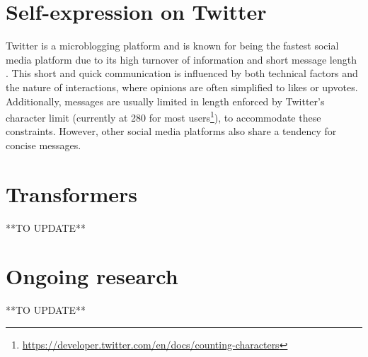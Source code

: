 \section{Self-expression on Twitter}
Twitter is a microblogging platform and is known for being the fastest social media platform due to its high turnover of information and short message length \cite{istanbulluogluComplaintHandlingSocial2017}. This short and quick communication is influenced by both technical factors and the nature of interactions, where opinions are often simplified to likes or upvotes. Additionally, messages are usually limited in length enforced by Twitter's character limit (currently at 280 for most users\footnote{\url{https://developer.twitter.com/en/docs/counting-characters}}), to accommodate these constraints. However, other social media platforms also share a tendency for concise messages.

\section{Transformers}
**TO UPDATE**

\section{Ongoing research}
**TO UPDATE**